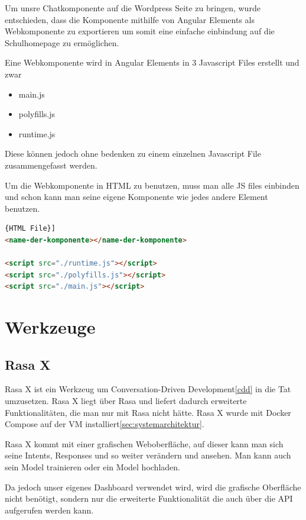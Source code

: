 Um unsre Chatkomponente auf die Wordpress Seite zu bringen, wurde entschieden, dass die Komponente mithilfe von Angular Elements als Webkomponente zu exportieren um somit eine einfache einbindung auf die Schulhomepage zu ermöglichen.

Eine Webkomponente wird in Angular Elements in 3 Javascript Files erstellt und zwar

\begin{itemize}
    \item main.js
    \item polyfills.js
    \item runtime.js
\end{itemize}

Diese können jedoch ohne bedenken zu einem einzelnen Javascript File zusammengefasst werden.

Um die Webkomponente in HTML zu benutzen, muss man alle JS files einbinden und schon kann man seine eigene Komponente wie jedes andere Element benutzen.
\begin{lstlisting}[language=html,label={lst:webcomponent},caption={HTML File}]{HTML File}]
<name-der-komponente></name-der-komponente>

<script src="./runtime.js"></script>
<script src="./polyfills.js"></script>
<script src="./main.js"></script>
\end{lstlisting}

\section{Werkzeuge}

\subsection{Rasa X}\label{subsec:rasa-x}
Rasa X ist ein Werkzeug um Conversation-Driven Development\ref{cdd} in die Tat umzusetzen\cite{rasax}.
Rasa X liegt über Rasa und liefert dadurch erweiterte Funktionalitäten, die man nur mit Rasa nicht hätte.
Rasa X wurde mit Docker Compose\cite{rasaxDocker} auf der VM installiert\ref{sec:systemarchitektur}.

Rasa X kommt mit einer grafischen Weboberfläche, auf dieser kann man sich seine Intents, Responses und so weiter verändern und ansehen.
Man kann auch sein Model trainieren oder ein Model hochladen.

Da jedoch unser eigenes Dashboard verwendet wird, wird die grafische Oberfläche nicht benötigt, sondern nur die erweiterte Funktionalität die auch über die API aufgerufen werden kann.

